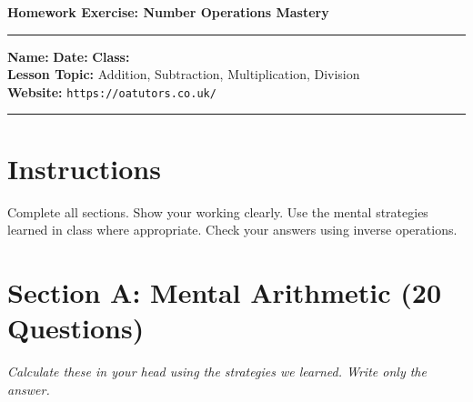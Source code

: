 \documentclass{article}
\begin{document}
\onehalfspacing


\begin{center}
\textbf{\Large Homework Exercise: Number Operations Mastery}
\vspace{0.2cm}
\end{center}

\hrule
\vspace{0.1cm}

\textbf{Name:} \underline{\hspace{4cm}} \quad \textbf{Date:} \underline{\hspace{3cm}} \quad \textbf{Class:} \underline{\hspace{2cm}} \\
\textbf{Lesson Topic:} Addition, Subtraction, Multiplication, Division \\
\textbf{Website:} \texttt{https://oatutors.co.uk/}

\vspace{0.2cm}
\hrule
\vspace{0.3cm}

\section*{Instructions}
Complete all sections. Show your working clearly. Use the mental strategies learned in class where appropriate. Check your answers using inverse operations.

\section{Section A: Mental Arithmetic (20 Questions)}
\textit{Calculate these in your head using the strategies we learned. Write only the answer.}
\end{document}

